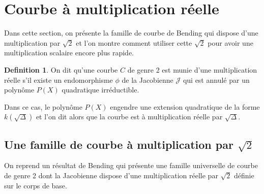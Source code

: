 \documentclass[a4paper,12pt]{article}
\theoremstyle{definition}
\newtheorem{definition}{Definition}[section]
\theoremstyle{remark}
\numberwithin{equation}{section}
\begin{document}
\section{Courbe à multiplication réelle}

Dans cette section, on présente la famille de courbe de Bending qui dispose d'une multiplication par $\sqrt{2}$ et l'on montre comment utiliser cette $\sqrt{2}$ pour avoir une multiplication scalaire encore plus rapide.

\begin{definition}
On dit qu'une courbe $C$ de genre 2 est munie d'une multiplication réelle s'il existe un endomorphisme $\phi$ de la Jacobienne $\mathcal{J}$ qui est annulé par un polynôme $P(X)$ quadratique irréductible.

Dans ce cas, le polynôme $P(X)$ engendre une extension quadratique de la forme $k(\sqrt\Delta)$ et l'on dit alors que la courbe est à multiplication réelle par $\sqrt\Delta$.
\end{definition}

\subsection{Une famille de courbe à multiplication par \texorpdfstring{$\sqrt{2}$}{sqrt2}}

On reprend un résultat de Bending qui présente une famille universelle de courbe de genre 2 dont la Jacobienne dispose d'une multiplication réelle par $\sqrt2$ définie sur le corps de base.
\end{document}
